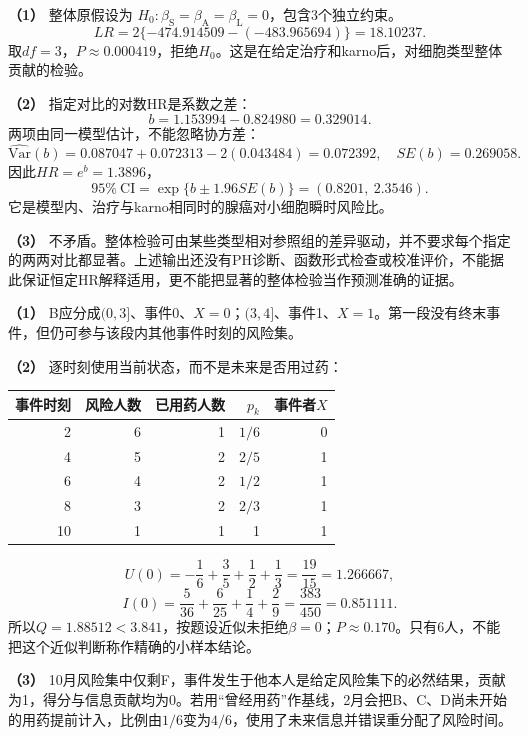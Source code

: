 \textbf{（1）} 整体原假设为
$H_0:\beta_{\mathrm S}=\beta_{\mathrm A}=\beta_{\mathrm L}=0$，包含3个独立约束。
\[
LR=2\{-474.914509-(-483.965694)\}=18.10237.
\]
取$df=3$，$P\approx0.000419$，拒绝$H_0$。这是在给定治疗和karno后，对细胞类型整体贡献的检验。

\textbf{（2）} 指定对比的对数HR是系数之差：
\[
b=1.153994-0.824980=0.329014.
\]
两项由同一模型估计，不能忽略协方差：
\[
\widehat{\mathrm{Var}}(b)
=0.087047+0.072313-2(0.043484)
=0.072392,\quad SE(b)=0.269058.
\]
因此$HR=e^b=1.3896$，
\[
95\%\ \mathrm{CI}=\exp\{b\pm1.96SE(b)\}
=(0.8201,\ 2.3546).
\]
它是模型内、治疗与karno相同时的腺癌对小细胞瞬时风险比。

\textbf{（3）} 不矛盾。整体检验可由某些类型相对参照组的差异驱动，并不要求每个指定的两两对比都显著。上述输出还没有PH诊断、函数形式检查或校准评价，不能据此保证恒定HR解释适用，更不能把显著的整体检验当作预测准确的证据。
\par\nobreak\smallskip{}

\textbf{（1）} B应分成$(0,3]$、事件0、$X=0$；$(3,4]$、事件1、$X=1$。第一段没有终末事件，但仍可参与该段内其他事件时刻的风险集。

\textbf{（2）} 逐时刻使用当前状态，而不是未来是否用过药：
\begin{center}\begin{tabular}{rrrrr}\toprule
事件时刻 & 风险人数 & 已用药人数 & $p_k$ & 事件者$X$\\\midrule
2 & 6 & 1 & $1/6$ & 0\\
4 & 5 & 2 & $2/5$ & 1\\
6 & 4 & 2 & $1/2$ & 1\\
8 & 3 & 2 & $2/3$ & 1\\
10 & 1 & 1 & 1 & 1\\\bottomrule
\end{tabular}\end{center}
\[
U(0)=-\frac16+\frac35+\frac12+\frac13
=\frac{19}{15}=1.266667,
\]
\[
I(0)=\frac5{36}+\frac6{25}+\frac14+\frac29
=\frac{383}{450}=0.851111.
\]
所以$Q=1.88512<3.841$，按题设近似未拒绝$\beta=0$；$P\approx0.170$。只有6人，不能把这个近似判断称作精确的小样本结论。

\textbf{（3）} 10月风险集中仅剩F，事件发生于他本人是给定风险集下的必然结果，贡献为1，得分与信息贡献均为0。若用“曾经用药”作基线，2月会把B、C、D尚未开始的用药提前计入，比例由$1/6$变为$4/6$，使用了未来信息并错误重分配了风险时间。
\par\nobreak\smallskip{}

